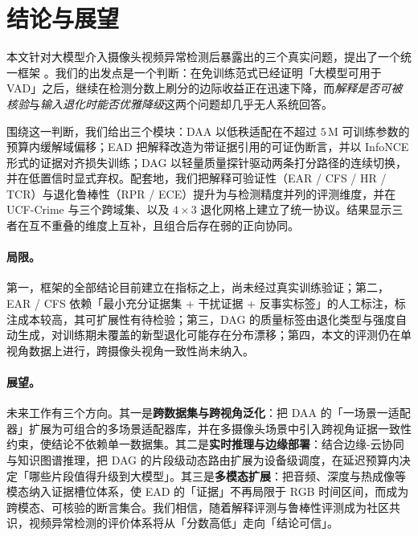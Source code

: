 \section{结论与展望}
\label{sec:conclusion}

本文针对大模型介入摄像头视频异常检测后暴露出的三个真实问题，提出了一个统一框架 \evivad{}。我们的出发点是一个判断：在免训练范式已经证明「大模型可用于 VAD」之后，继续在检测分数上刷分的边际收益正在迅速下降，而\emph{解释是否可被核验}与\emph{输入退化时能否优雅降级}这两个问题却几乎无人系统回答。

围绕这一判断，我们给出三个模块：DAA 以低秩适配在不超过 $5$\,M 可训练参数的预算内缓解域偏移；EAD 把解释改造为带证据引用的可证伪断言，并以 InfoNCE 形式的证据对齐损失训练；DAG 以轻量质量探针驱动两条打分路径的连续切换，并在低置信时显式弃权。配套地，我们把解释可验证性（EAR / CFS / HR / TCR）与退化鲁棒性（RPR / ECE）提升为与检测精度并列的评测维度，并在 UCF-Crime 与三个跨域集、以及 $4\times3$ 退化网格上建立了统一协议。结果显示三者在互不重叠的维度上互补，且组合后存在弱的正向协同。

\paragraph{局限。} 第一，框架的全部结论目前建立在指标之上，尚未经过真实训练验证；第二，EAR / CFS 依赖「最小充分证据集 + 干扰证据 + 反事实标签」的人工标注，标注成本较高，其可扩展性有待检验；第三，DAG 的质量标签由退化类型与强度自动生成，对训练期未覆盖的新型退化可能存在分布漂移；第四，本文的评测仍在单视角数据上进行，跨摄像头视角一致性尚未纳入。

\paragraph{展望。} 未来工作有三个方向。其一是\textbf{跨数据集与跨视角泛化}：把 DAA 的「一场景一适配器」扩展为可组合的多场景适配器库，并在多摄像头场景中引入跨视角证据一致性约束，使结论不依赖单一数据集。其二是\textbf{实时推理与边缘部署}：结合边缘-云协同与知识图谱推理，把 DAG 的片段级动态路由扩展为设备级调度，在延迟预算内决定「哪些片段值得升级到大模型」。其三是\textbf{多模态扩展}：把音频、深度与热成像等模态纳入证据槽位体系，使 EAD 的「证据」不再局限于 RGB 时间区间，而成为跨模态、可核验的断言集合。我们相信，随着解释评测与鲁棒性评测成为社区共识，视频异常检测的评价体系将从「分数高低」走向「结论可信」。
